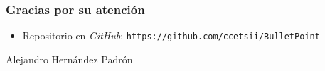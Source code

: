 \begin{frame} [fragile]
  \frametitle{Gracias por su atención}
  \block{\BulletPoint}
    \begin{itemize}
    \item Repositorio en {\it GitHub}: \texttt{https://github.com/ccetsii/BulletPoint}
    \end{itemize}
    \begin{flushright}
    Alejandro Hernández Padrón  \\
    \end{flushright}
  \endblock{}
\end{frame}